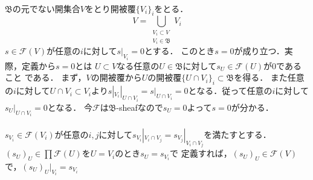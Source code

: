 {  %
}{
  \\
  $\mathfrak{B}$の元でない開集合$V$をとり開被覆$\{V_{i}\}_{i}$をとる．
  \begin{equation*}
    V = \bigcup_{\substack{V_{i} \subset V\\ V_{i} \in \mathfrak{B}}}V_{i} 
  \end{equation*}
  $s\in \mathcal{F}(V)$が任意の$i$に対して$s|_{V_{i}} = 0$とする．
  このとき$s= 0$が成り立つ．実際，定義から$s=0$とは
  $U\subset V$なる任意の$U\in \mathfrak{B}$に対して$s_{U}\in \mathcal{F}(U)$が$0$であること
  である．
  まず，$V$の開被覆から$U$の開被覆$\{U\cap V_{i}\}_{i} \subset \mathfrak{B}$を得る．
  また任意の$i$に対して$U\cap V_{i} \subset V_{i}$より$s|_{V_{i}}|_{U\cap V_{i}} = s|_{U\cap V_{i}} = 0$となる．従って任意の$i$に対して$s_{U}|_{U\cap V_{i}} = 0$となる．
  今$\mathcal{F}$は$\mathfrak{B}$-sheafなので$s_{U} = 0$よって$s=0$が分かる．\\
  \\
  $s_{V_{i}} \in \mathcal{F}(V_{i})$が任意の$i,j$に対して$s_{V_{i}}|_{V_{i}\cap V_{j}} = s_{V_{j}}|_{V_{i} \cap V_{j}}$を満たすとする．
  $(s_{U})_{U}\in \prod \mathcal{F}(U)$を$U = V_{i}$のとき$s_{U} = s_{V_{i}}$で
  定義すれば，$(s_{U})_{U} \in \mathcal{F}(V)$で，$(s_{U})_{U}|_{V_{i}} = s_{V_{i}}$
}
